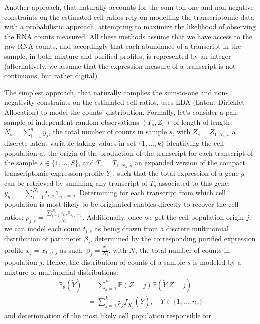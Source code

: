 Another approach, that naturally accounts for the sum-ton-one and
non-negative constraints on the estimated cell ratios rely on modelling
the transcriptomic data with a probabilistic approach, attempting to
maximize the likelihood of observing the RNA counts measured. All these
methods assume that we have access to the raw RNA counts, and
accordingly that each abundance of a transcript in the sample, in both
mixture and purified profiles, is represented by an integer
(alternatively, we assume that the expression measure of a transcript is
not continuous, but rather digital).

The simplest approach, that naturally complies the sum-to-one and
non-negativity constraints on the estimated cell ratios, uses LDA
(Latent Dirichlet Allocation) \autocite{blei_etal03} to model the counts' distribution. Formally, let's
consider a pair sample of independent random observations \((T_s, Z_s)\)
of length of length \(N_s = \sum_{i=1}^n y_j\), the total number of
counts in sample \(s\), with \(Z_s= Z_{1:N_s, s}\) a discrete latent
variable taking values in set \(\{1, \ldots, k\}\) identifying the cell
population at the origin of the production of the transcript for each
transcript of the sample \(s \in \{1, \ldots, S\}\), and
\(T_s = T_{1:N_s, s}\) an expanded version of the compact transcriptomic
expression profile \(Y_s\), such that the total expression of a gene
\(g\) can be retrieved by summing any transcript of \(T_s\) associated
to this
gene:\(y_{g,s} = \sum_{i=1}^{N_s} t_{i,s} \,\mathbb{1}_{t_{i,s} = g}\).
Determining for each transcript from which cell population is most
likely to be originated enables directly to recover the cell ratios:
\(p_{j,s}= \frac{\sum_{i=1}^{N_s} z_{i,s} \mathbb{1}_{z_{i,s} = j}}{N_s}\).
Additionally, once we get the cell population origin \(j\), we can model
each count \(t_{i, s}\) as being drawn from a discrete multinomial
distribution of parameter \(\beta_j\), determined by the corresponding
purified expression profile \(x_j=x_{1:n,j}\) as such:
\(\beta_j = \frac{x_j}{N_j}\), with \(N_j\) the total number of counts
in population \(j\). Hence, the distribution of counts of a sample \(s\)
is modeled by a mixture of multinomial distributions: \[
\begin{aligned}
\mathbb{P}_{\theta} (\widetilde{Y}) &=  \sum_{j=1}^k \mathbb{P} (Z=j) \mathbb{P} (\widetilde{Y} |Z=j)\\
&=\sum_{j=1}^k p_j f_{\widetilde{X_j}} (\widetilde{Y}), \quad \widetilde{Y} \in \{1, \ldots, n_s \}
\end{aligned}
\] and determination of the most likely cell population responsible for

